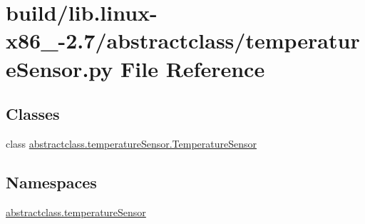 \hypertarget{build_2lib_8linux-x86__64-2_87_2abstractclass_2temperatureSensor_8py}{}\section{build/lib.linux-\/x86\+\_-\/2.7/abstractclass/temperature\+Sensor.py File Reference}
\label{build_2lib_8linux-x86__64-2_87_2abstractclass_2temperatureSensor_8py}
\subsection*{Classes}
\begin{DoxyCompactItemize}
\item 
class \hyperlink{classabstractclass_1_1temperatureSensor_1_1TemperatureSensor}{abstractclass.\+temperature\+Sensor.\+Temperature\+Sensor}
\end{DoxyCompactItemize}
\subsection*{Namespaces}
\begin{DoxyCompactItemize}
\item 
 \hyperlink{namespaceabstractclass_1_1temperatureSensor}{abstractclass.\+temperature\+Sensor}
\end{DoxyCompactItemize}
